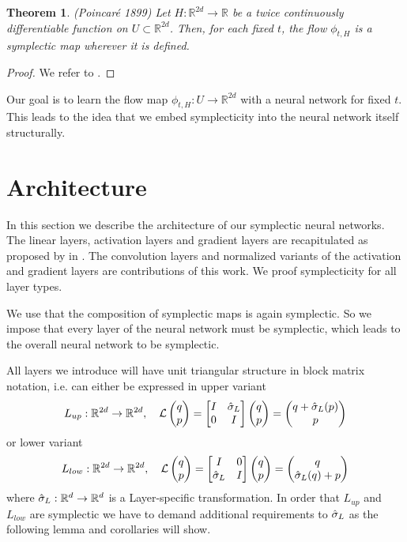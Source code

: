 \documentclass[twoside,a4paper]{article}
\newtheorem{theorem}{Theorem}
\begin{document}
\begin{theorem}(Poincaré 1899)
	Let $H: \mathbb{R}^{2d} \to \mathbb{R}$ be a twice continuously differentiable
	function on $U \subset \mathbb{R}^{2d}$. Then, for each fixed $t$, the flow
	$\phi_{t,H}$ is a symplectic map wherever it is defined.
\end{theorem}
\begin{proof}
	We refer to \citet[Theorem 2.4, p.~184]{hairer2006}.
\end{proof}

Our goal is to learn the flow map $\phi_{t,H} : U \to \mathbb{R}^{2d}$ with a neural network
for fixed $t$.
This leads to the idea that we embed symplecticity into the neural network itself structurally. 

\section{Architecture}

In this section we describe the architecture of our symplectic neural networks.
The linear layers, activation layers and gradient layers are recapitulated as 
proposed by \citeauthor{Jin2020} in \cite{Jin2020}.
The convolution layers and normalized variants of the activation and gradient layers
are contributions of this work. 
We proof symplecticity for all layer types. 

We use that the composition of symplectic maps is again symplectic. So we impose that every
layer of the neural network must be symplectic, which leads to the overall neural network
to be symplectic.

All layers we introduce will have unit triangular structure in block matrix notation, 
i.e. can either be expressed in upper variant
\begin{equation*}
	L_{up} : \mathbb{R}^{2d} \to \mathbb{R}^{2d},
	\quad \mathcal{L} \begin{pmatrix} q \\ p \end{pmatrix} = \begin{bmatrix} I & {\hat{\sigma}_L} \\ 0 & I \end{bmatrix} \begin{pmatrix} q \\ p \end{pmatrix}
	= \begin{pmatrix}
		q + \hat{\sigma}_L(p) \\
		p
	\end{pmatrix}
\end{equation*}
or lower variant
\begin{equation*}
	L_{low} : \mathbb{R}^{2d} \to \mathbb{R}^{2d},
	\quad \mathcal{L} \begin{pmatrix} q \\ p \end{pmatrix} = \begin{bmatrix} I & 0 \\ {\hat{\sigma}_L} & I \end{bmatrix} \begin{pmatrix} q \\ p \end{pmatrix}
	= \begin{pmatrix}
		q \\
		\hat{\sigma}_L(q) + p
	\end{pmatrix}
\end{equation*}
where $\hat{\sigma}_L : \mathbb{R}^d \to \mathbb{R}^d$ is a Layer-specific transformation.
In order that $L_{up}$ and $L_{low}$ are symplectic we have to demand additional requirements
to $\hat{\sigma}_L$ as the following lemma and corollaries will show.
\end{document}
